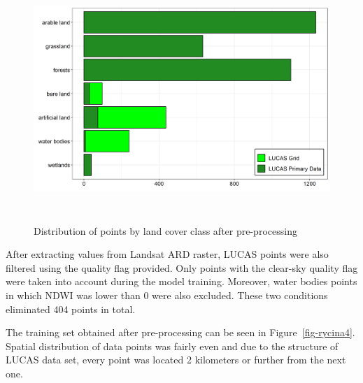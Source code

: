 \documentclass{amuthesis}
\begin{document}
\begin{figure}[H]

{\centering \includegraphics[width=5.79167in,height=3.64583in]{./figures/lucas_data.png}

}

\caption{\label{fig-rycina3}Distribution of points by land cover class
after pre-processing}

\end{figure}

After extracting values from Landsat ARD raster, LUCAS points were also
filtered using the quality flag provided. Only points with the clear-sky
quality flag were taken into account during the model training.
Moreover, water bodies points in which NDWI was lower than 0 were also
excluded. These two conditions eliminated 404 points in total.

The training set obtained after pre-processing can be seen in
Figure~\ref{fig-rycina4}. Spatial distribution of data points was fairly
even and due to the structure of LUCAS data set, every point was located
2 kilometers or further from the next one.
\end{document}
